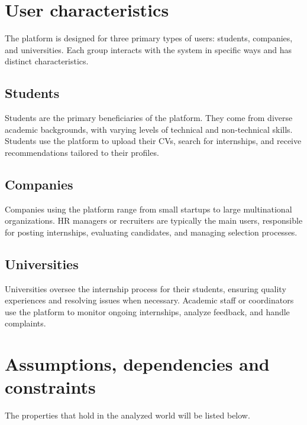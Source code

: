 \section{User characteristics}\label{sec:user-characteristics}
The platform is designed for three primary types of users: students, companies, and universities.
Each group interacts with the system in specific ways and has distinct characteristics.

\subsection*{Students}
Students are the primary beneficiaries of the platform.
They come from diverse academic backgrounds, with varying levels of technical and non-technical skills.
Students use the platform to upload their CVs, search for internships, and receive recommendations tailored to their profiles.

\subsection*{Companies}
Companies using the platform range from small startups to large multinational organizations.
HR managers or recruiters are typically the main users, responsible for posting internships, evaluating candidates, and managing selection processes.

\subsection*{Universities}
Universities oversee the internship process for their students, ensuring quality experiences and resolving issues when necessary.
Academic staff or coordinators use the platform to monitor ongoing internships, analyze feedback, and handle complaints.

\section{Assumptions, dependencies and constraints}\label{sec:assumptions-dependencies-and-constraints}
The properties that hold in the analyzed world will be listed below.

